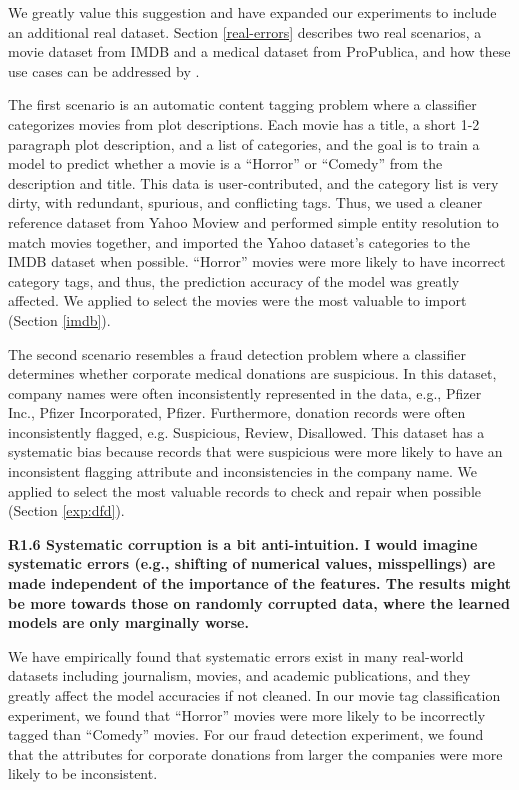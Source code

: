 \noindent We greatly value this suggestion and have expanded our experiments to include an additional real dataset.
Section \ref{real-errors} describes two real scenarios, a movie dataset from IMDB and a medical dataset from ProPublica, and how these use cases can be addressed by \sys.

The first scenario is an automatic content tagging problem where a classifier categorizes movies from plot descriptions.
Each movie has a title, a short 1-2 paragraph plot description, and a list of categories, and the goal is to train a model to predict whether a movie is a ``Horror'' or ``Comedy'' from the description and title. 
This data is user-contributed, and the category list is very dirty, with redundant, spurious, and conflicting tags.  
Thus, we used a cleaner reference dataset from Yahoo Moview and performed simple entity resolution to match movies together, and imported the Yahoo dataset's categories to the IMDB dataset when possible.
``Horror'' movies were more likely to have incorrect category tags, and thus, the prediction accuracy of the model was greatly affected. 
We applied \sys to select the movies were the most valuable to import (Section \ref{imdb}). 

The second scenario resembles a fraud detection problem where a classifier determines whether corporate medical donations are suspicious.
In this dataset, company names were often inconsistently represented in the data, e.g., Pfizer Inc., Pfizer Incorporated, Pfizer.
Furthermore, donation records were often inconsistently flagged, e.g. Suspicious, Review, Disallowed.
This dataset has a systematic bias because records that were suspicious were more likely to have an inconsistent flagging attribute and inconsistencies in the company name.
We applied \sys to select the most valuable records to check and repair when possible (Section \ref{exp:dfd}). 

\vspace{0.5em}

\noindent\textbf{R1.6 Systematic corruption is a bit anti-intuition. I would imagine systematic errors (e.g., shifting of numerical values, misspellings) are made independent of the importance of the features. The results might be more towards those on randomly corrupted data, where the learned models are only marginally worse.}

\noindent  We have empirically found that systematic errors exist in many real-world datasets including journalism, movies, and academic publications, and they greatly affect the model accuracies if not cleaned. In our movie tag classification experiment, we found that ``Horror'' movies were more likely to be incorrectly tagged than ``Comedy'' movies.
For our fraud detection experiment, we found that the attributes for corporate donations from larger the companies were more likely to be inconsistent.


